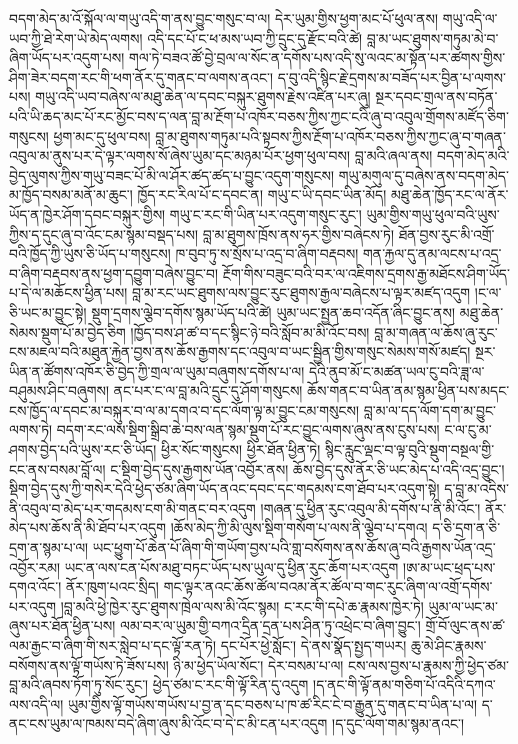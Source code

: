 \documentclass{article}
\begin{document}
བདག་མེད་མ་འོ་སྐོལ་ལ་གཡུ་འདི་ག་ནས་བྱུང་གསུང་བ་ལ། དེར་ཡུམ་གྱིས་ཕྱག་མང་པོ་ཕུལ་ནས། གཡུ་འདི་ལ་ཡབ་ཀྱི་ཐེ་རེག་ཡེ་མེད་ལགས། འདི་དང་པོ་ང་ཕ་མས་ཡབ་ཀྱི་དྲུང་དུ་རྫོང་བའི་ཚེ། བླ་མ་ཡང་ཐུགས་གཏུམ་མེ་བ་ཞིག་ཡོད་པར་འདུག་པས། གལ་ཏེ་བཟའ་ཚོ་བྱེ་བྲལ་ལ་སོང་ན་དགོས་པས་འདི་སུ་ལའང་མ་སྟོན་པར་ཚགས་གྱིས་ཤིག་ཟེར་བདག་རང་གི་ཕག་ནོར་དུ་གནང་བ་ལགས་ནའང་། ད་བུ་འདི་སྙིང་རྗེ་དྲགས་མ་བཟོད་པར་བྱིན་པ་ལགས་པས། གཡུ་འདི་ཡབ་བཞེས་ལ་མཐུ་ཆེན་ལ་དབང་བསྐུར་ཐུགས་རྗེས་འཛིན་པར་ཞུ། སྔར་དབང་གྲལ་ནས་བཏོན་པའི་ཡི་ཆད་མང་པོ་རང་མྱོང་བས་ད་ལན་བླ་མ་རྔོག་པ་འཁོར་བཅས་ཀྱིས་ཀྱང་ངའི་ཞུ་བ་འབུལ་གྲོགས་མཛོད་ཅིག་གསུངས། ཕྱག་མང་དུ་ཕུལ་བས། བླ་མ་ཐུགས་གཏུམ་པའི་སྟབས་ཀྱིས་རྔོག་པ་འཁོར་བཅས་ཀྱིས་ཀྱང་ཞུ་བ་གཞན་འབུལ་མ་ནུས་པར་དེ་ལྟར་ལགས་སོ་ཞེས་ཡུམ་དང་མཉམ་པོར་ཕྱག་ཕུལ་བས། བླ་མའི་ཞལ་ནས། བདག་མེད་མའི་བྱེད་ལུགས་ཀྱིས་གཡུ་བཟང་པོ་མི་ལ་ཤོར་ཚད་ཚད་པ་བྱུང་འདུག་གསུངས། གཡུ་མགུལ་དུ་བཞེས་ནས་བདག་མེད་མ་ཁྱོད་བསམ་མནོ་མ་ཆུང་། ཁྱོད་རང་རིལ་པོ་ང་དབང་ན། གཡུ་ང་ཡི་དབང་ཡིན་མོད། མཐུ་ཆེན་ཁྱོད་རང་ལ་ནོར་ཡོད་ན་ཁྱེར་ཤོག་དབང་བསྐུར་གྱིས། གཡུ་ང་རང་གི་ཡིན་པར་འདུག་གསུང་རུང་། ཡུམ་གྱིས་གཡུ་ཕུལ་བའི་ཡུས་ཀྱིས་ད་དུང་ཞུ་བ་འོང་ངམ་སྙམ་བསྡད་པས། བླ་མ་ཐུགས་ཁྲོས་ནས་ཧར་གྱིས་བཞེངས་ཏེ། ཐོན་བྱས་རུང་མི་འགྲོ་བའི་ཁྱོད་ཀྱི་ཡུས་ཅི་ཡོད་པ་གསུངས། ཁ་བུབ་ཏུ་ས་སྲོས་པ་འདྲ་བ་ཞིག་བརྡབས། གན་རྐྱལ་དུ་ནམ་ལངས་པ་འདྲ་བ་ཞིག་བརྡབས་ནས་ཕྱག་དབྱུག་བཞེས་བྱུང་བ། རྔོག་གིས་བཟུང་བའི་བར་ལ་འཇིགས་དྲགས་རྒྱ་མཐོངས་ཤིག་ཡོད་པ་དེ་ལ་མཆོངས་ཕྱིན་པས། བླ་མ་རང་ཡང་ཐུགས་ལས་བྱུང་རུང་ཐུགས་རྒྱལ་བཞེངས་པ་ལྟར་མཛད་འདུག །ང་ལ་ཅི་ཡང་མ་བྱུང་སྟེ། སྡུག་དྲགས་ལྕེབ་དགོས་སྙམ་ཡོད་པའི་ཚེ། ཡུམ་ཡང་སྤྱན་ཆབ་འདོན་ཞིང་བྱུང་ནས། མཐུ་ཆེན་སེམས་སྡུག་པོ་མ་བྱེད་ཅིག །ཁྱོད་བས་ཤ་ཚ་བ་དང་སྙིང་ཉེ་བའི་སློབ་མ་མི་འོང་བས། བླ་མ་གཞན་ལ་ཆོས་ཞུ་རུང་ངས་མཇལ་བའི་མཐུན་རྐྱེན་བྱས་ནས་ཆོས་རྒྱགས་དང་འབུལ་བ་ཡང་སྦྱིན་གྱིས་གསུང་སེམས་གསོ་མཛད། སྔར་ཡིན་ན་ཚོགས་འཁོར་ཅི་བྱེད་ཀྱི་གྲལ་ལ་ཡུམ་བཞུགས་དགོས་པ་ལ། དེའི་ནུབ་མོ་ང་མཚན་ཡལ་ངུ་བའི་ཟླ་ལ་བཤུམས་ཤིང་བཞུགས། ནང་པར་ང་ལ་བླ་མའི་དྲུང་དུ་ཤོག་གསུངས། ཆོས་གནང་བ་ཡིན་ནམ་སྙམ་ཕྱིན་པས་མདང་ངས་ཁྱོད་ལ་དབང་མ་བསྐུར་བ་ལ་མ་དགའ་བ་དང་ལོག་ལྟ་མ་བྱུང་ངམ་གསུངས། བླ་མ་ལ་དད་ལོག་དག་མ་བྱུང་ལགས་ཏེ། བདག་རང་ལས་སྡིག་སྒྲིབ་ཆེ་བས་ལན་སྙམ་སྡུག་པོ་རང་བྱུང་ལགས་ཞུས་ནས་ངུས་པས། ང་ལ་ངུ་མ་ཤགས་བྱེད་པའི་ཡུས་རང་ཅི་ཡོད། ཕྱིར་སོང་གསུངས། ཕྱིར་ཐོན་ཕྱིན་ཏེ། སྙིང་རླུང་ལྡང་བ་ལྟ་བུའི་སྡུག་བསྔལ་གྱི་ངང་ནས་བསམ་བློ་ལ། ང་སྡིག་བྱེད་དུས་རྒྱགས་ཡོན་འབྱོར་ནས། ཆོས་བྱེད་དུས་ནོར་ཅི་ཡང་མེད་པ་འདི་འདྲ་བྱུང་། སྡིག་བྱེད་དུས་ཀྱི་གསེར་དེའི་ཕྱེད་ཙམ་ཞིག་ཡོད་ནའང་དབང་དང་གདམས་ངག་ཐོབ་པར་འདུག་སྟེ། ད་བླ་མ་འདིས་ནི་འབུལ་བ་མེད་པར་གདམས་ངག་མི་གནང་བར་འདུག །གཞན་དུ་ཕྱིན་རུང་འབུལ་མི་དགོས་པ་ནི་མི་འོང་། ནོར་མེད་པས་ཆོས་ནི་མི་ཐོབ་པར་འདུག །ཆོས་མེད་ཀྱི་མི་ལུས་སྡིག་གསོག་པ་ལས་ནི་ལྕེབ་པ་དགའ། ད་ཅི་དྲག་ན་ཅི་དྲག་ན་སྙམ་པ་ལ། ཡང་ཕྱུག་པོ་ཆེན་པོ་ཞིག་གི་གཡོག་བྱས་པའི་གླ་བསོགས་ནས་ཆོས་ཞུ་བའི་རྒྱགས་ཡོན་འདྲ་འབྱོར་རམ། ཡང་ན་ལས་ངན་པོས་མཐུ་བཏང་ཡོད་པས་ཡུལ་དུ་ཕྱིན་རུང་ཆོག་པར་འདུག །ཨ་མ་ཡང་ཕྲད་པས་དགའ་འོང་། ནོར་ཁུག་པའང་སྲིད། གང་ལྟར་ནའང་ཆོས་ཚོལ་བའམ་ནོར་ཚོལ་བ་གང་རུང་ཞིག་ལ་འགྲོ་དགོས་པར་འདུག །བླ་མའི་ཕྱེ་ཁྱེར་རུང་ཐུགས་ཁྲེལ་ལས་མི་འོང་སྙམ། ང་རང་གི་དཔེ་ཆ་རྣམས་ཁྱེར་ཏེ། ཡུམ་ལ་ཡང་མ་ཞུས་པར་ཐོན་ཕྱིན་པས། ལམ་བར་ལ་ཡུམ་གྱི་བཀའ་དྲིན་དྲན་པས་ཤིན་ཏུ་འཕྲེང་བ་ཞིག་བྱུང་། གྲོ་བོ་ལུང་ནས་ཚ་ལམ་རྒྱང་བ་ཞིག་གི་སར་སླེབ་པ་དང་ལྟོ་རན་ཏེ། དང་པོར་ཕྱེ་སློང་། དེ་ནས་སྣོད་སྤྱད་གཡར། ཆུ་མེ་ཤིང་རྣམས་བསོགས་ནས་ལྟོ་གཡོས་ཏེ་ཟོས་པས། ཉི་མ་ཕྱེད་ཡོལ་སོང་། དེར་བསམ་པ་ལ། ངས་ལས་བྱས་པ་རྣམས་ཀྱི་ཕྱེད་ཙམ་བླ་མའི་ཞབས་ཏོག་ཏུ་སོང་རུང་། ཕྱེད་ཙམ་ང་རང་གི་ལྟོ་རིན་དུ་འདུག །ད་ནང་གི་ལྟོ་ནམ་གཅིག་པོ་འདིའི་དཀའ་ལས་འདི་ལ། ཡུམ་གྱིས་ལྟོ་གཡོས་གཡོས་པ་བྱ་ན་དང་བཅས་པ་ཁ་ཚ་རིང་ངེ་བ་རྒྱུན་དུ་གནང་བ་ཡིན་པ་ལ། ད་ནང་ངས་ཡུམ་ལ་ཁམས་བདེ་ཞིག་ཞུས་མི་འོང་བ་དེ་ང་མི་ངན་པར་འདུག །ད་དུང་ལོག་གམ་སྙམ་ནའང་། 
\end{document}
